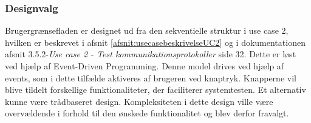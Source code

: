 \subsubsection{Designvalg}
Brugergrænsefladen er designet ud fra den sekventielle struktur i use case 2, hvilken er beskrevet i afsnit \ref{afsnit:usecasebeskrivelseUC2} og i dokumentationen afsnit 3.5.2-\textit{Use case 2 - Test kommunikationsprotokoller} side 32. Dette er løst ved hjælp af Event-Driven Programming.
Denne model drives ved hjælp af events, som i dette tilfælde aktiveres af brugeren ved knaptryk. Knapperne vil blive tildelt forskellige funktionaliteter, der faciliterer systemtesten.
Et alternativ kunne være trådbaseret design. Kompleksiteten i dette design ville være overvældende i forhold til den ønskede funktionalitet og blev derfor fravalgt.